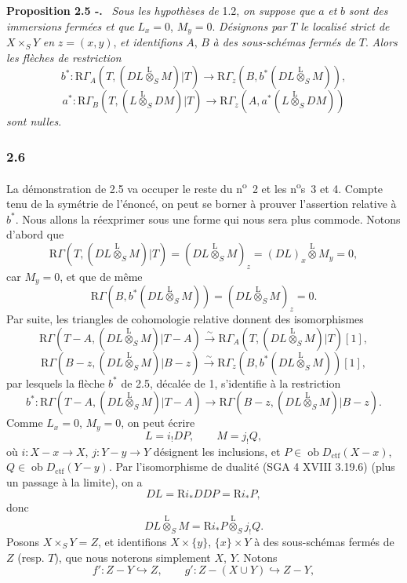 \documentclass[11pt]{article}
\newenvironment{statement}[1]{\par\medskip\noindent\textbf{#1.}\ }{\par\medskip}
\newcommand{\R}{\mathrm{R}}\newcommand{\RHomCore}{\mathrm{RHom}}
\providecommand{\lten}{\overset{\mathrm L}{\otimes}}
\providecommand{\Ob}{\operatorname{ob}}
\providecommand{\lten}{\overset{\mathrm L}{\otimes}}
\providecommand{\lten}{\overset{\mathrm L}{\otimes}}
\providecommand{\Ob}{\operatorname{ob}}
\providecommand{\R}{\mathrm R}
\providecommand{\lten}{\overset{\mathrm L}{\otimes}}
\providecommand{\lten}{\overset{\mathrm L}{\otimes}}
\providecommand{\Ob}{\operatorname{Ob}}
\providecommand{\lten}{\overset{\mathrm L}{\otimes}}
\providecommand{\Ob}{\operatorname{ob}}
\providecommand{\Ob}{\operatorname{Ob}}
\providecommand{\lten}{\overset{\mathrm L}{\otimes}}
\begin{document}
\begin{statement}{Proposition 2.5 -}
\emph{Sous les hypothèses de} 1.2, \emph{on suppose que} $a$ \emph{et} $b$ \emph{sont des immersions fermées et que} $L_x=0$, $M_y=0$. \emph{Désignons par} $T$ \emph{le localisé strict de} $X\times_SY$ \emph{en} $z=(x,y)$, \emph{et identifions} $A$, $B$ \emph{à des sous-schémas fermés de} $T$. \emph{Alors les flèches de restriction}
\[
b^*:\R\Gamma_A(T,(DL\lten_SM)|T)
 \longrightarrow \R\Gamma_z(B,b^*(DL\lten_SM)),
\]
\[
a^*:\R\Gamma_B(T,(L\lten_SDM)|T)
 \longrightarrow \R\Gamma_z(A,a^*(L\lten_SDM))
\]
\emph{sont nulles}.
\end{statement}

\subsubsection*{2.6}
La démonstration de 2.5 va occuper le reste du n\textsuperscript{o}~2 et les n\textsuperscript{o}s~3 et 4. Compte tenu de la symétrie de l'énoncé, on peut se borner à prouver l'assertion relative à $b^*$. Nous allons la réexprimer sous une forme qui nous sera plus commode. Notons d'abord que
\[
\R\Gamma(T,(DL\lten_SM)|T)
 =(DL\lten_SM)_z
 =(DL)_x\lten M_y=0,
\]
car $M_y=0$, et que de même
\[
\R\Gamma(B,b^*(DL\lten_SM))
 =(DL\lten_SM)_z=0.
\]
Par suite, les triangles de cohomologie relative donnent des isomorphismes
\[
\R\Gamma(T-A,(DL\lten_SM)|T-A)
 \xrightarrow{\sim}
\R\Gamma_A(T,(DL\lten_SM)|T)[1],
\]
\[
\R\Gamma(B-z,(DL\lten_SM)|B-z)
 \xrightarrow{\sim}
\R\Gamma_z(B,b^*(DL\lten_SM))[1],
\]
par lesquels la flèche $b^*$ de 2.5, décalée de 1, s'identifie à la restriction
\begin{equation}
b^*:\R\Gamma(T-A,(DL\lten_SM)|T-A)
 \longrightarrow \R\Gamma(B-z,(DL\lten_SM)|B-z).
\tag{2.6.1}
\end{equation}
Comme $L_x=0$, $M_y=0$, on peut écrire
\begin{equation}
L=i_!DP,\qquad M=j_!Q,
\tag{2.6.2}
\end{equation}
où $i:X-x\to X$, $j:Y-y\to Y$
désignent les inclusions, et $P\in\Ob D_{\mathrm{ctf}}(X-x)$, $Q\in\Ob D_{\mathrm{ctf}}(Y-y)$. Par l'isomorphisme de dualité (SGA 4 XVIII 3.19.6) (plus un passage à la limite), on a
\[
DL=\R i_*DDP=\R i_*P,
\]
donc
\[
DL\lten_SM=\R i_*P\lten_Sj_!Q.
\]
Posons $X\times_SY=Z$, et identifions $X\times\{y\}$, $\{x\}\times Y$ à des sous-schémas fermés de $Z$ (resp. $T$), que nous noterons simplement $X$, $Y$. Notons
\[
f':Z-Y\hookrightarrow Z,\qquad
g':Z-(X\cup Y)\hookrightarrow Z-Y,
\]
\end{document}
